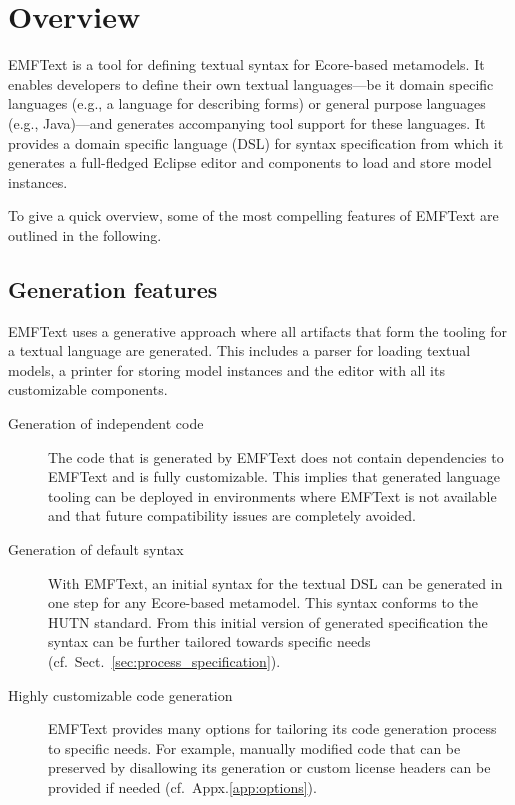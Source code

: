 \chapter{Overview}
EMFText is a tool for defining textual syntax for Ecore-based metamodels. It 
enables developers to define their own textual languages---be it domain
specific languages (e.g., a language for describing forms) or general purpose 
languages (e.g., Java)---and generates accompanying tool support for these 
languages. It provides a domain specific language (DSL) for syntax 
specification from which it generates a full-fledged Eclipse editor and 
components to load and store model instances.

To give a quick overview, some of the most compelling features of EMFText are 
outlined in the following.

\section{Generation features}
EMFText uses a generative approach where all artifacts that form the tooling for
a textual language are generated. This includes a parser for loading textual 
models, a printer for storing model instances and the editor with all its
customizable components.

\begin{description}

  \item[Generation of independent code]
        The code that is generated by EMFText does not contain dependencies
        to EMFText and is fully customizable. This implies that generated 
        language tooling can be deployed in environments where EMFText is not 
        available and that future compatibility issues are completely avoided.

  \item[Generation of default syntax]
        With EMFText, an initial syntax for the textual DSL can be generated 
        in one step for any Ecore-based metamodel. This syntax conforms to the 
        HUTN standard. From this initial version of generated specification the 
        syntax can be further tailored towards specific needs (cf.~Sect.~\ref{sec:process_specification}).
        
  \item[Highly customizable code generation]
        EMFText provides many options for tailoring its code generation process
        to specific needs. For example, manually modified code that can be preserved
        by disallowing its generation or custom license headers can be provided 
        if needed (cf.~Appx.\ref{app:options}\label{app:options}).

\end{description}


